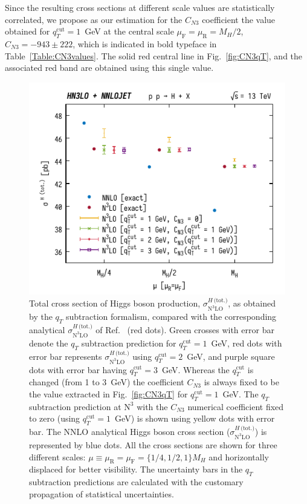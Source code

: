 \documentclass[12pt]{article}
\DeclareRobustCommand{\mur}{\ensuremath{\mu_{\mathrm{R}}}\xspace}
\DeclareRobustCommand{\muR}{\mur}
\DeclareRobustCommand{\muf}{\ensuremath{\mu_{\mathrm{F}}}\xspace}
\DeclareRobustCommand{\muF}{\muf}
\DeclareRobustCommand{\qt}{\ensuremath{q_T}\xspace}
\DeclareRobustCommand{\qtcut}{\ensuremath{q_T^\mathrm{cut}}\xspace}
\DeclareRobustCommand{\tot}{\text{(tot.)}\xspace}
\DeclareRobustCommand{\LO}{\text{LO}\xspace}
\DeclareRobustCommand{\N}[1]{\ensuremath{\text{N}^{#1}}} %
\begin{document}
Since the resulting cross sections at different scale values are statistically correlated, we propose as our estimation for the $C_{N3}$ coefficient the value obtained for  $\qtcut=1$~GeV   at the central scale $\muF=\muR=M_{H}/2$, $C_{N3}=-943 \pm 222$, which is indicated in bold typeface in Table~\ref{Table:CN3values}.
The solid red central line in Fig.~\ref{fig:CN3qT}, and the associated red band are obtained using this single value. 

\begin{figure}
\centering
\includegraphics[width=.6\linewidth]{./new_figures/totXsecN3LO}
\caption{\label{fig:totXsecN3LO}{Total cross section of Higgs boson production, $\sigma^{H\,\tot}_{\N{3}\LO}$, as obtained by the $\qt$ subtraction formalism, compared with the corresponding analytical $\sigma^{H\,\tot}_{\N3\LO}$ of Ref.~\cite{Mistlberger:2018etf} (red dots). Green crosses with error bar denote the $\qt$ subtraction prediction for $\qtcut=1$~GeV, red dots with error bar represents  $\sigma^{H\,\tot}_{\N3\LO}$ using $\qtcut=2$~GeV, and purple square dots with error bar having $\qtcut=3$~GeV. Whereas the $\qtcut$ is changed (from 1 to 3~GeV) the coefficient $C_{N3}$ is always fixed to be the value extracted in Fig.~\ref{fig:CN3qT} for $\qtcut=1$~GeV. The $\qt$ subtraction prediction at \N3\LO with the $C_{N3}$ numerical coefficient fixed to zero (using $\qtcut=1$~GeV) is shown using yellow dots with error bar. The NNLO analytical Higgs boson cross section ($\sigma^{{H\,\tot}}_{\N3\LO}$) is represented by blue dots. All the cross sections are shown for three different scales: $\mu \equiv \muR = \muF = \{1/4,1/2,1 \} M_H$ and horizontally displaced for better visibility. The uncertainty bars in the $\qt$ subtraction predictions are calculated with the customary propagation of statistical uncertainties.}}
\end{figure}
\end{document}

